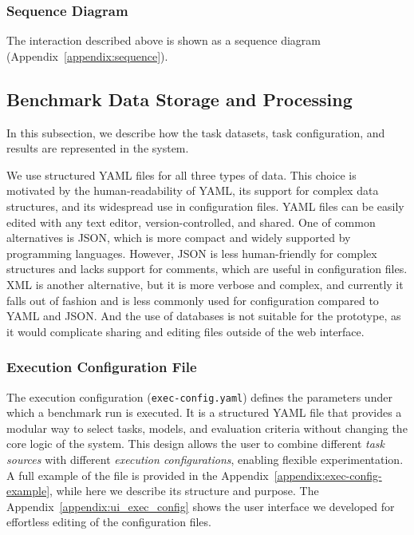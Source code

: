 \subsubsection{Sequence Diagram}

The interaction described above is shown as a sequence diagram (Appendix~\ref{appendix:sequence}).


\subsection{Benchmark Data Storage and Processing}

In this subsection, we describe how the task datasets, task configuration, and results are represented in the system.

We use structured YAML files for all three types of data.
This choice is motivated by the human-readability of YAML, its support for complex data structures, and its widespread use in configuration files.
YAML files can be easily edited with any text editor, version-controlled, and shared.
One of common alternatives is JSON, which is more compact and widely supported by programming languages.
However, JSON is less human-friendly for complex structures and lacks support for comments, which are useful in configuration files.
XML is another alternative, but it is more verbose and complex, and currently it falls out of fashion and is less commonly used for configuration compared to YAML and JSON.
And the use of databases is not suitable for the prototype, as it would complicate sharing and editing files outside of the web interface.

\subsubsection{Execution Configuration File}

The execution configuration (\texttt{exec-config.yaml}) defines the parameters under which a benchmark run is executed.
It is a structured YAML file that provides a modular way to select tasks, models, and evaluation criteria without changing the core logic of the system.
This design allows the user to combine different \emph{task sources} with different \emph{execution configurations}, enabling flexible experimentation.
A full example of the file is provided in the Appendix~\ref{appendix:exec-config-example}, while here we describe its structure and purpose.
The Appendix~\ref{appendix:ui_exec_config} shows the user interface we developed for effortless editing of the configuration files.


